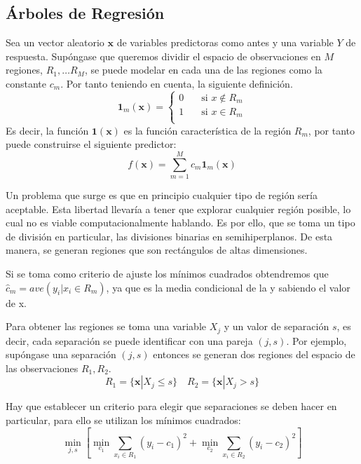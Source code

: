 \subsection{Árboles de Regresión}
\noindent Sea un vector aleatorio $\textbf{x}$ de variables predictoras como antes y una variable $Y$ de respuesta. 
Supóngase que queremos dividir el espacio de observaciones en $M$ regiones, $R_1,\ldots R_M$, se puede modelar en cada una de las regiones como la constante $c_m$. Por tanto teniendo en cuenta, la siguiente definición. 
\begin{equation}
\mathbf{1}_m(\textbf{x})=
\begin{cases}
0\quad& \text{si } x\notin R_m\\
1\quad& \text{si } x\in R_m\\
\end{cases}
\end{equation}
Es decir, la función $\mathbf{1}(\textbf{x})$ es la función característica de la región $R_m$, por tanto puede construirse el siguiente predictor:
\begin{equation}
f(\textbf{x})=\sum_{m=1}^M c_m \mathbf{1}_m(\textbf{x})
\end{equation}

\noindent Un problema que surge es que en principio cualquier tipo de región sería aceptable. Esta libertad llevaría a tener que explorar cualquier región posible, lo cual no es viable computacionalmente hablando. Es por ello, que se toma un tipo de división en particular, las divisiones binarias en semihiperplanos. De esta manera, se generan regiones que son rectángulos de altas dimensiones. 


\noindent Si se toma como criterio de ajuste los mínimos cuadrados obtendremos que $\hat{c}_m=ave(y_i|x_i\in R_m)$, ya que es la media condicional de la y sabiendo el valor de x. 

\noindent Para obtener las regiones se toma una variable $X_j$ y un valor de separación $s$, es decir, cada separación se puede identificar con una pareja $(j,s)$. 
Por ejemplo, supóngase una separación $(j,s)$ entonces se generan dos regiones del espacio de las observaciones $R_1, R_2$. 
\begin{equation}
R_1=\lbrace\textbf{x}|X_j\leq s\rbrace\quad R_2=\lbrace\textbf{x}|X_j > s\rbrace 
\end{equation}

\noindent Hay que establecer un criterio para elegir que separaciones se deben hacer en particular, para ello se utilizan los mínimos cuadrados:
\begin{equation}
\min_{j,s}\left[\min_{c_1}\sum_{x_i\in R_1}(y_i-c_1)^2+\min_{c_2}\sum_{x_i\in R_2}(y_i-c_2)^2\right]
\end{equation}

